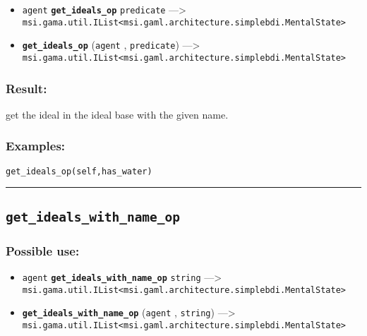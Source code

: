 \documentclass[]{book}
\providecommand{\tightlist}{%
  \setlength{\itemsep}{0pt}\setlength{\parskip}{0pt}}
\theoremstyle{definition}
\theoremstyle{definition}
\theoremstyle{definition}
\theoremstyle{remark}
\begin{document}
\begin{itemize}
\tightlist
\item
  \texttt{agent} \textbf{\texttt{get\_ideals\_op}} \texttt{predicate}
  ---\textgreater{}
  \texttt{msi.gama.util.IList\textless{}msi.gaml.architecture.simplebdi.MentalState\textgreater{}}
\item
  \textbf{\texttt{get\_ideals\_op}} (\texttt{agent} ,
  \texttt{predicate}) ---\textgreater{}
  \texttt{msi.gama.util.IList\textless{}msi.gaml.architecture.simplebdi.MentalState\textgreater{}}
\end{itemize}

\subsubsection{Result:}\label{result-205}

get the ideal in the ideal base with the given name.

\subsubsection{Examples:}\label{examples-158}

\begin{verbatim}
get_ideals_op(self,has_water) 
\end{verbatim}

\begin{center}\rule{0.5\linewidth}{\linethickness}\end{center}

\subsection{\texorpdfstring{\texttt{get\_ideals\_with\_name\_op}}{get\_ideals\_with\_name\_op}}\label{get_ideals_with_name_op}

\subsubsection{Possible use:}\label{possible-use-212}

\begin{itemize}
\tightlist
\item
  \texttt{agent} \textbf{\texttt{get\_ideals\_with\_name\_op}}
  \texttt{string} ---\textgreater{}
  \texttt{msi.gama.util.IList\textless{}msi.gaml.architecture.simplebdi.MentalState\textgreater{}}
\item
  \textbf{\texttt{get\_ideals\_with\_name\_op}} (\texttt{agent} ,
  \texttt{string}) ---\textgreater{}
  \texttt{msi.gama.util.IList\textless{}msi.gaml.architecture.simplebdi.MentalState\textgreater{}}
\end{itemize}
\end{document}
